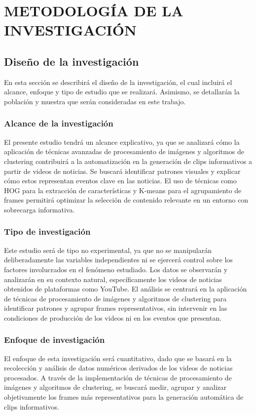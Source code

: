 \chapter{METODOLOGÍA DE LA INVESTIGACIÓN}

\section{Diseño de la investigación}

En esta sección se describirá el diseño de la investigación, el cual incluirá el alcance, enfoque y tipo de estudio que se realizará. Asimismo, se detallarán la población y muestra que serán consideradas en este trabajo.

\subsection{Alcance de la investigación}
El presente estudio tendrá un alcance explicativo, ya que se analizará cómo la aplicación de técnicas avanzadas de procesamiento de imágenes y algoritmos de clustering contribuirá a la automatización en la generación de clips informativos a partir de videos de noticias. Se buscará identificar patrones visuales y explicar cómo estos representan eventos clave en las noticias. El uso de técnicas como HOG para la extracción de características y K-means para el agrupamiento de frames permitirá optimizar la selección de contenido relevante en un entorno con sobrecarga informativa.

\subsection{Tipo de investigación}
Este estudio será de tipo no experimental, ya que no se manipularán deliberadamente las variables independientes ni se ejercerá control sobre los factores involucrados en el fenómeno estudiado. Los datos se observarán y analizarán en su contexto natural, específicamente los videos de noticias obtenidos de plataformas como YouTube. El análisis se centrará en la aplicación de técnicas de procesamiento de imágenes y algoritmos de clustering para identificar patrones y agrupar frames representativos, sin intervenir en las condiciones de producción de los videos ni en los eventos que presentan.

\subsection{Enfoque de investigación}
El enfoque de esta investigación será cuantitativo, dado que se basará en la recolección y análisis de datos numéricos derivados de los videos de noticias procesados. A través de la implementación de técnicas de procesamiento de imágenes y algoritmos de clustering, se buscará medir, agrupar y analizar objetivamente los frames más representativos para la generación automática de clips informativos.
